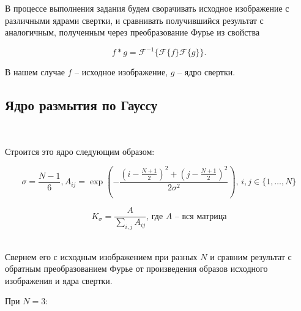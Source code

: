 \documentclass[a4paper]{article}
\begin{document}
В процессе выполнения задания будем сворачивать исходное изображение с различными ядрами свертки, и сравнивать получившийся результат с аналогичным, полученным через преобразование Фурье из свойства

$$
f * g = \mathcal{F}^{-1}\{\mathcal{F}\{f\}\mathcal{F}\{g\}\}.
$$

В нашем случае $f$ -- исходное изображение, $g$ -- ядро свертки.

\subsection{Ядро размытия по Гауссу}\ 

Строится это ядро следующим образом:

$$
\sigma=\frac{N-1}{6}, A_{ij}=\exp{\left(-\frac{(i-\frac{N+1}{2})^2+(j-\frac{N+1}{2})^2}{2\sigma^2}\right)}, \, i,j \in \{1, \dots, N\}
$$

$$
K_\sigma = \frac{A}{\sum_{i,j}A_{ij}}, \, \text{где $A$ -- вся матрица}
$$\

Свернем его с исходным изображением при разных $N$ и сравним результат с обратным преобразованием Фурье от произведения образов исходного изображения и ядра свертки.\ 

При $N = 3$:
\end{document}
